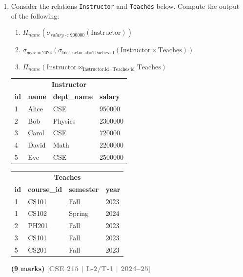 \documentclass[12pt,a3paper]{article}
\newcommand{\yr}[1]{\hfill\textcolor{gray}{\small\textbf{[#1]}}}
\newcommand{\mk}[1]{\textcolor{orange!70!black}{\small\textbf{(#1 marks)}}}
\begin{document}
\begin{enumerate}

\item Consider the relations \texttt{Instructor} and \texttt{Teaches} below. Compute the output of the following:
\begin{enumerate}
  \item $\Pi_{name}(\sigma_{salary < 900000}(\text{Instructor}))$
  \item $\sigma_{year=2024}(\sigma_{\text{Instructor.id}=\text{Teaches.id}}(\text{Instructor} \times \text{Teaches}))$
  \item $\Pi_{name}(\text{Instructor} \bowtie_{\text{Instructor.id}=\text{Teaches.id}} \text{Teaches})$
\end{enumerate}
\begin{center}
\small
\begin{tabular}{llll}
\toprule
\multicolumn{4}{c}{\textbf{Instructor}}\\
\textbf{id} & \textbf{name} & \textbf{dept\_name} & \textbf{salary}\\
\midrule
1 & Alice & CSE     & 950000\\
2 & Bob   & Physics & 2300000\\
3 & Carol & CSE     & 720000\\
4 & David & Math    & 2200000\\
5 & Eve   & CSE     & 2500000\\
\bottomrule
\end{tabular}
\quad
\begin{tabular}{llll}
\toprule
\multicolumn{4}{c}{\textbf{Teaches}}\\
\textbf{id} & \textbf{course\_id} & \textbf{semester} & \textbf{year}\\
\midrule
1 & CS101 & Fall   & 2023\\
1 & CS102 & Spring & 2024\\
2 & PH201 & Fall   & 2023\\
3 & CS101 & Fall   & 2023\\
5 & CS201 & Fall   & 2023\\
\bottomrule
\end{tabular}
\end{center}
\mk{9} \yr{CSE 215 | L-2/T-1 | 2024--25}


\end{enumerate}
\end{document}
